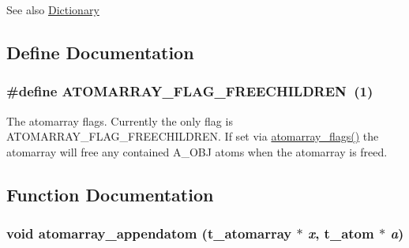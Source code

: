 \begin{DoxySeeAlso}{See also}
\hyperlink{group__dictionary}{Dictionary} 
\end{DoxySeeAlso}


\subsection{Define Documentation}
\hypertarget{group__atomarray_ga9d4f9396731ae8115a08f99d02421d02}{
\subsubsection[{ATOMARRAY\_\-FLAG\_\-FREECHILDREN}]{\setlength{\rightskip}{0pt plus 5cm}\#define ATOMARRAY\_\-FLAG\_\-FREECHILDREN~(1)}}
\label{group__atomarray_ga9d4f9396731ae8115a08f99d02421d02}


The atomarray flags. Currently the only flag is ATOMARRAY\_\-FLAG\_\-FREECHILDREN. If set via \hyperlink{group__atomarray_gad99be67bb7fafb7987412ee8fc2802f0}{atomarray\_\-flags()} the atomarray will free any contained A\_\-OBJ atoms when the atomarray is freed. 

\subsection{Function Documentation}
\hypertarget{group__atomarray_gad2d3608a3089f42590d744814c6fee42}{
\subsubsection[{atomarray\_\-appendatom}]{\setlength{\rightskip}{0pt plus 5cm}void atomarray\_\-appendatom ({\bf t\_\-atomarray} $\ast$ {\em x}, \/  {\bf t\_\-atom} $\ast$ {\em a})}}
\label{group__atomarray_gad2d3608a3089f42590d744814c6fee42}


